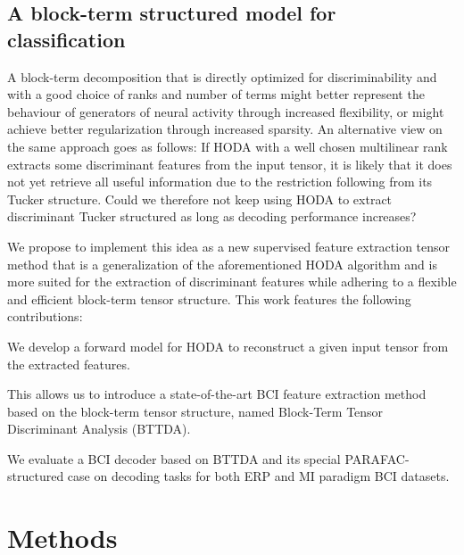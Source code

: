 
\subsection{A block-term structured model for classification}

A block-term decomposition that is directly optimized for discriminability and with a
good choice of ranks and number of terms might better represent the behaviour
of generators of neural activity through increased flexibility, or might
achieve better regularization through increased sparsity.
An alternative view on the same approach goes as follows:
If HODA with a well chosen multilinear rank extracts some discriminant features
from the input tensor, it is likely that it does not yet retrieve all useful
information due to the restriction following from its Tucker structure.
Could we therefore not keep using HODA to extract discriminant Tucker structured
as long as decoding performance increases?

We propose to implement this idea as a new supervised feature
extraction tensor method that is a generalization of the aforementioned HODA
algorithm and is more suited for the extraction of discriminant
features while adhering to a flexible and efficient block-term tensor
structure.
This work features the following contributions:
\begin{enumerate*}[label={\arabic*)}]
	\item  We develop a forward model for HODA to reconstruct a
	      given input tensor from the extracted features.
	\item This allows us to introduce a state-of-the-art BCI feature extraction
        method based on the block-term tensor structure, named Block-Term Tensor Discriminant Analysis
	      (BTTDA).
  \item We evaluate a BCI decoder based on BTTDA and its special
	      PARAFAC-structured case on decoding tasks for both ERP and MI
	      paradigm BCI datasets.
\end{enumerate*}
\section{Methods}

